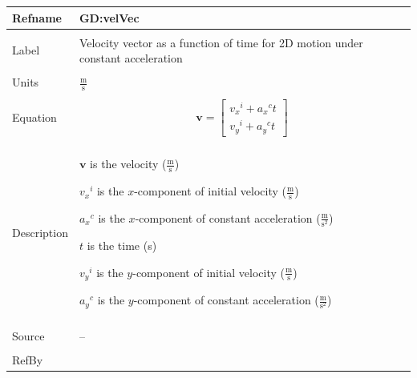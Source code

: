 \documentclass[12pt]{article}
\begin{document}
\noindent \begin{minipage}{\textwidth}
          \begin{tabular}{>{\raggedright}p{}>{\raggedright\arraybackslash}p{}}
          \toprule \textbf{Refname} & \textbf{GD:velVec}
          \label{GD:velVec}
          \\ \midrule \\
          Label & Velocity vector as a function of time for 2D motion under constant acceleration
          \\ \midrule \\
          Units & $\frac{\text{m}}{\text{s}}$
          \\ \midrule \\
          Equation & \begin{displaymath}
                     \mathbf{v}=\begin{bmatrix}
                                {{v_{x}}^{i}}+{{a_{x}}^{c}} t\\
{{v_{y}}^{i}}+{{a_{y}}^{c}} t
                                \end{bmatrix}
                     \end{displaymath}
          \\ \midrule \\
          Description & \begin{symbDescription}
                        \item{$\mathbf{v}$ is the velocity ($\frac{\text{m}}{\text{s}}$)}
                        \item{${{v_{x}}^{i}}$ is the $x$-component of initial velocity ($\frac{\text{m}}{\text{s}}$)}
                        \item{${{a_{x}}^{c}}$ is the $x$-component of constant acceleration ($\frac{\text{m}}{\text{s}^{2}}$)}
                        \item{$t$ is the time (s)}
                        \item{${{v_{y}}^{i}}$ is the $y$-component of initial velocity ($\frac{\text{m}}{\text{s}}$)}
                        \item{${{a_{y}}^{c}}$ is the $y$-component of constant acceleration ($\frac{\text{m}}{\text{s}^{2}}$)}
                        \end{symbDescription}
          \\ \midrule \\
          Source & --
          \\ \midrule \\
          RefBy & 
          \\ \bottomrule
          \end{tabular}
          \end{minipage}
\end{document}
